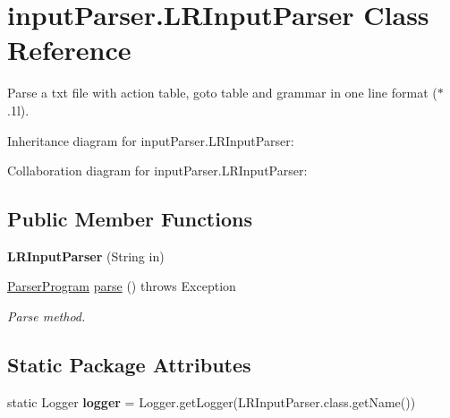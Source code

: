 \hypertarget{classinput_parser_1_1_l_r_input_parser}{\section{input\-Parser.\-L\-R\-Input\-Parser Class Reference}
\label{classinput_parser_1_1_l_r_input_parser}
}


Parse a txt file with action table, goto table and grammar in one line format ($\ast$.1l).  




Inheritance diagram for input\-Parser.\-L\-R\-Input\-Parser\-:


Collaboration diagram for input\-Parser.\-L\-R\-Input\-Parser\-:
\subsection*{Public Member Functions}
\begin{DoxyCompactItemize}
\item 
\hypertarget{classinput_parser_1_1_l_r_input_parser_a42f9947db4e863a82e3a8ca89c655c2a}{{\bfseries L\-R\-Input\-Parser} (String in)}\label{classinput_parser_1_1_l_r_input_parser_a42f9947db4e863a82e3a8ca89c655c2a}

\item 
\hyperlink{classparser_program_1_1_parser_program}{Parser\-Program} \hyperlink{classinput_parser_1_1_l_r_input_parser_ad81d1510d9b12b4b8b2dedbe117e88c1}{parse} ()  throws Exception 
\begin{DoxyCompactList}\small\item\em Parse method. \end{DoxyCompactList}\end{DoxyCompactItemize}
\subsection*{Static Package Attributes}
\begin{DoxyCompactItemize}
\item 
\hypertarget{classinput_parser_1_1_l_r_input_parser_ae3d6e07ebb7d4368f1a2e2ad05dae6f7}{static Logger {\bfseries logger} = Logger.\-get\-Logger(L\-R\-Input\-Parser.\-class.\-get\-Name())}\label{classinput_parser_1_1_l_r_input_parser_ae3d6e07ebb7d4368f1a2e2ad05dae6f7}

\end{DoxyCompactItemize}

